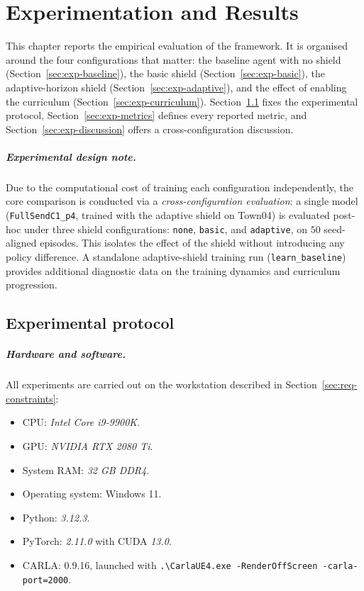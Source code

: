 
\chapter{Experimentation and Results}\label{ch:experimentation}

This chapter reports the empirical evaluation of the framework. It is organised around the four
configurations that matter: the baseline agent with no shield
(Section~\ref{sec:exp-baseline}), the basic shield (Section~\ref{sec:exp-basic}), the
adaptive-horizon shield (Section~\ref{sec:exp-adaptive}), and the effect of enabling the
curriculum (Section~\ref{sec:exp-curriculum}).
Section~\ref{sec:exp-protocol} fixes the experimental protocol,
Section~\ref{sec:exp-metrics} defines every reported metric, and
Section~\ref{sec:exp-discussion} offers a cross-configuration discussion.

\paragraph{Experimental design note.}
Due to the computational cost of training each configuration independently, the core
comparison is conducted via a \emph{cross-configuration evaluation}: a single model
(\texttt{FullSendC1\_p4}, trained with the adaptive shield on Town04) is evaluated
post-hoc under three shield configurations: \texttt{none}, \texttt{basic}, and
\texttt{adaptive}, on \(50\) seed-aligned episodes. This isolates the effect of the
shield without introducing any policy difference. A standalone adaptive-shield training run
(\texttt{learn\_baseline}) provides additional diagnostic data on the training dynamics and
curriculum progression.

\section{Experimental protocol}\label{sec:exp-protocol}

\paragraph{Hardware and software.}
All experiments are carried out on the workstation described in
Section~\ref{sec:req-constraints}:
\begin{itemize}
  \item CPU: \emph{Intel Core i9-9900K}.
  \item GPU: \emph{NVIDIA RTX 2080 Ti}.
  \item System RAM: \emph{32 GB DDR4}.
  \item Operating system: Windows 11.
  \item Python: \emph{3.12.3}.
  \item PyTorch: \emph{2.11.0} with CUDA \emph{13.0}.
  \item CARLA: 0.9.16, launched with \texttt{.\textbackslash CarlaUE4.exe -RenderOffScreen
        -carla-port=2000}.
\end{itemize}

